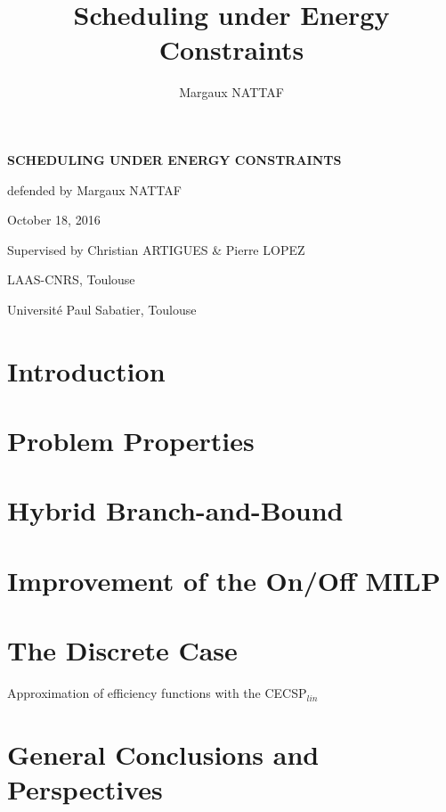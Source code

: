 \documentclass{beamer}
\title{Scheduling under Energy Constraints}
\author{Margaux NATTAF}
\institute{LAAS-CNRS Toulouse

  Université Paul Sabatier Toulouse}
\begin{document}
{\canvasspecial
  \begin{frame}
    \vspace{1.5cm}
    \begin{flushleft}
      {\Large \bf \color{bleuLAAS}SCHEDULING UNDER ENERGY CONSTRAINTS}
      
      \vspace{0.3cm}
      \small \color{bleuLAAS!90} defended by Margaux NATTAF

      October 18, 2016
    \end{flushleft}
    \vspace{0.5cm}

    {\footnotesize  \color{bleuLAAS!80}
      Supervised by Christian ARTIGUES \& Pierre LOPEZ}

    \vspace{1.5cm}
    \begin{flushright} \color{bleuLAAS!70}
      \scriptsize LAAS-CNRS, Toulouse

      Université Paul Sabatier, Toulouse
    \end{flushright}
  \end{frame}}


\setcounter{framenumber}{0}

\section{Introduction}


\section{Problem Properties}
%
\section{Hybrid Branch-and-Bound}
%

\section{Improvement of the On/Off MILP}
%

\section{The Discrete Case}
\begin{frame}{Approximation of efficiency functions with the CECSP$_{lin}$}
  
\end{frame}
\section{General Conclusions and Perspectives}
\end{document}
